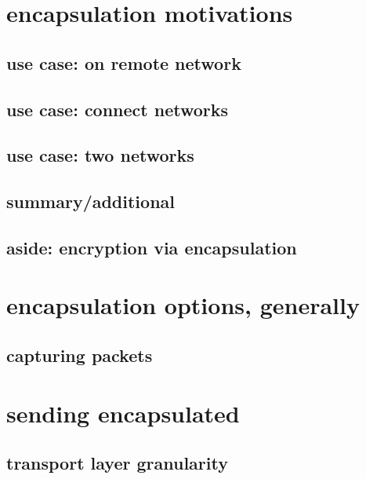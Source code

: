 
\section{encapsulation motivations}
\subsection{use case: on remote network}

\subsection{use case: connect networks}


\subsection{use case: two networks}



\subsection{summary/additional}


\subsection{aside: encryption via encapsulation}




\section{encapsulation options, generally}


\subsection{capturing packets}


\section{sending encapsulated}

\subsection{transport layer granularity}

